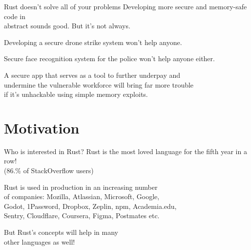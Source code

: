 \documentclass[usenames,dvipsnames,10pt,aspectratio=169]{beamer}
\begin{document}
\begin{frame}{Rust doesn't solve all of your problems}
\large
\textcolor{ucuyellow}{
Developing more secure and memory-safe code in\\
abstract sounds good. But it's not always.\\
}
\vspace{0.4cm}

Developing a secure drone strike system won't help anyone.\\
\vspace{0.2cm}

Secure face recognition system for the police won't help anyone either.\\
\vspace{0.2cm}

A secure app that serves as a tool to further underpay and\\
undermine the vulnerable workforce will bring far more trouble\\
if it's unhackable using simple memory exploits.
\end{frame}


 
\section{Motivation}%
 
\begin{frame}{Who is interested in Rust?}
	\large
	\textcolor{ucuyellow}{Rust is the most loved language for the fifth year in a row!}\\
	\footnotesize{(86.\% of StackOverflow users)}

	\vspace{0.5cm}

	\large
	Rust is used in production in an increasing number\\
	of companies: Mozilla, Atlassian, Microsoft, Google,\\
	Godot, 1Password, Dropbox, Zeplin, npm, Academia.edu,\\
	Sentry, Cloudflare, Coursera, Figma, Postmates etc.

	\vspace{0.5cm}

	\large
	But Rust's concepts will help in many\\
	other languages as well!
\end{frame} 
\end{document}
